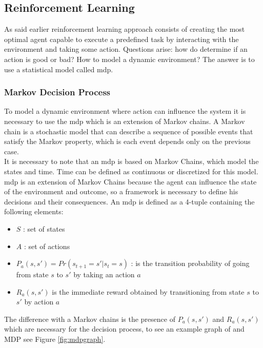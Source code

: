 \subsection{Reinforcement Learning}
As said earlier reinforcement learning approach consists of creating the most optimal agent capable to execute a predefined task by interacting with the environment and taking some action. Questions arise: how do determine if an action is good or bad? How to model a dynamic environment? The answer is to use a statistical model called \acrfull{mdp}.
\subsubsection{Markov Decision Process}
To model a dynamic environment where action can influence the system it is necessary to use the \acrfull{mdp} which is an extension of Markov chains. 
A Markov chain is a stochastic model that can describe a sequence of possible events that satisfy the Markov property, which is each event depends only on the previous case.\\
It is necessary to note that an \acrshort{mdp} is based on Markov Chains, which model the states and time. Time can be defined as continuous or discretized for this model.
\acrshort{mdp} is an extension of Markov Chains because the agent can influence the state of the environment and outcome, so a framework is necessary to define his decisions and their consequences. An \acrshort{mdp} is defined as a 4-tuple containing the following elements:
\begin{itemize}
	\item $S$ : set of states
	\item $A$ : set of actions
	\item $P_a (s, s') = Pr(s_{t+1} = s' \vert s_{t} = s)$ : is the transition probability of going from state $s$ to $s'$ by taking an action $a$
	\item $R_{a}(s,s')$ is the immediate reward obtained by transitioning from state $s$ to $s'$ by action $a$
\end{itemize}
The difference with a Markov chains is the presence of $P_a (s, s')$ and $R_{a}(s,s')$ which are necessary for the decision process, to see an example graph of and MDP see Figure \ref{fig:mdpgraph}.
